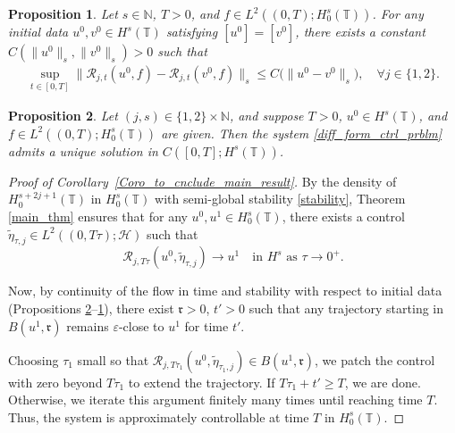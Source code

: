 \documentclass[10pt,a4paper]{amsart}
\newtheorem{proposition}{Proposition}
\begin{document}
\begin{proposition}\label{prp_stability}  
	Let \( s \in \mathbb{N} \), \( T > 0 \), and \( f \in L^2((0, T); H^s_0(\mathbb{T})) \). For any initial data \( u^0, v^0 \in H^s(\mathbb{T}) \) satisfying \( [u^0] = [v^0] \), there exists a constant \( C(\|u^0\|_s, \|v^0\|_s) > 0 \) such that  
	\begin{align}\label{stability}  
		\sup_{t \in [0, T]} \|\mathcal{R}_{j, t}(u^0, f) - \mathcal{R}_{j, t}(v^0, f)\|_s \leq C \Big(\|u^0 - v^0\|_s \Big), \quad \forall j \in \{1, 2\}.  
	\end{align}  
\end{proposition}

\begin{proposition}\label{prp_existence}
	Let $(j, s) \in \{1, 2\} \times \mathbb{N}$, and suppose $T > 0$, \( u^0 \in H^s(\mathbb{T}) \), and \( f \in L^2((0, T); H^s_0(\mathbb{T})) \) are given. Then the system \eqref{diff_form_ctrl_prblm} admits a unique solution in \( C([0, T]; H^s(\mathbb{T})) \).  
\end{proposition}

\begin{proof}[Proof of Corollary~\ref{Coro_to_cnclude_main_result}]
	By the density of \( H^{s + 2j + 1}_0(\mathbb{T}) \) in \( H^s_0(\mathbb{T}) \) with semi-global stability \eqref{stability}, Theorem \ref{main_thm} ensures that for any \( u^0, u^1 \in H^s_0(\mathbb{T}) \), there exists a control \( \tilde{\eta}_{\tau, j} \in L^2((0, T\tau); \mathcal{H}) \) such that  
	\[
	\mathcal{R}_{j, T\tau}(u^0, \tilde{\eta}_{\tau, j}) \to u^1 \quad \text{in } H^s \text{ as } \tau \to 0^+.
	\]
	
	Now, by continuity of the flow in time and stability with respect to initial data (Propositions \ref{prp_existence}–\ref{prp_stability}), there exist \( \mathfrak{r} > 0 \), \( t' > 0 \) such that any trajectory starting in \( B(u^1, \mathfrak{r}) \) remains \( \varepsilon \)-close to \( u^1 \) for time \( t' \).
	
	Choosing \( \tau_1 \) small so that \( \mathcal{R}_{j, T\tau_1}(u^0, \tilde{\eta}_{\tau_1, j}) \in B(u^1, \mathfrak{r}) \), we patch the control with zero beyond \( T\tau_1 \) to extend the trajectory. If \( T\tau_1 + t' \geq T \), we are done. Otherwise, we iterate this argument finitely many times until reaching time \( T \). Thus, the system is approximately controllable at time \( T \) in \( H^s_0(\mathbb{T}) \).
\end{proof}
\end{document}

